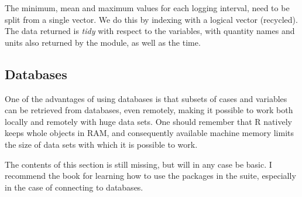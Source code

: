 \documentclass[krantz2]{krantz}\usepackage{knitr}%
\begin{document}
The minimum, mean and maximum values for each logging interval, need to be split from a single vector. We do this by indexing with a logical vector (recycled). The data returned is \emph{tidy} with respect to the variables, with quantity names and units also returned by the module, as well as the time.

\begin{knitrout}\footnotesize
{}\color{fgcolor}\begin{kframe}
\begin{alltt}
     \hlkwb{<-} \hlstd{(Meteo01.lst[[}\hlstd{]])}
    \hlopt{::}
                      \hlstd{=}   \hlstd{=} \hlstd{,}  \hlstd{=} \hlstd{),}
                      
                      
                      \hlstd{= val.vector[}\hlstd{(}\hlstd{,} \hlstd{,} \hlstd{)],}
                      \hlstd{= val.vector[}\hlstd{(}\hlstd{,} \hlstd{,} \hlstd{)],}
                      \hlstd{= val.vector[}\hlstd{(}\hlstd{,} \hlstd{,} \hlstd{)],}
\end{alltt}
\end{kframe}
\end{knitrout}

\subsection{Databases}\label{sec:data:db}

One of the advantages of using databases is that subsets of cases and variables can be retrieved from databases, even remotely, making it possible to work both locally and remotely with huge data sets. One should remember that R natively keeps whole objects in RAM, and consequently available machine memory limits the size of data sets with which it is possible to work.

\begin{infobox}
The contents of this section is still missing, but will in any case be basic. I recommend the book  \autocite{Wickham2017} for learning how to use the packages in the  suite, especially in the case of connecting to databases.
\end{infobox}
\end{document}
